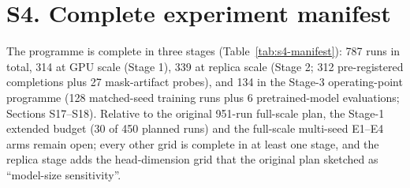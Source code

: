 \documentclass[10pt,a4paper]{article}
\begin{document}
\section*{S4. Complete experiment manifest}\label{sup:manifest}
The programme is complete in three stages (Table~\ref{tab:s4-manifest}):
787 runs in total, 314 at GPU scale (Stage 1), 339 at replica scale
(Stage 2; 312 pre-registered completions plus 27 mask-artifact probes), and
134 in the Stage-3 operating-point programme (128 matched-seed training runs
plus 6 pretrained-model evaluations; Sections S17--S18). Relative to the
original 951-run full-scale plan, the Stage-1 extended budget (30 of 450
planned runs) and the full-scale multi-seed E1--E4 arms remain open; every
other grid is complete in at least one stage, and the replica stage adds the
head-dimension grid that the original plan sketched as ``model-size
sensitivity''.
\end{document}
